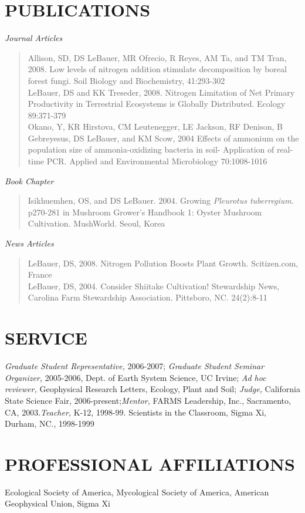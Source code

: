 \documentclass[line,10pt]{res}
\begin{document}
\begin{resume}
\section{PUBLICATIONS}
{\sl Journal Articles}
\begin{verse}
 Allison, SD, DS LeBauer, MR Ofrecio, R Reyes, AM Ta, and TM Tran, 2008. Low levels of nitrogen addition stimulate decomposition by boreal forest fungi. Soil Biology and Biochemistry, 41:293-302 \\ 
 LeBauer, DS and KK Treseder, 2008. Nitrogen Limitation of Net Primary Productivity in Terrestrial Ecosystems is Globally Distributed. Ecology 89:371-379\\
 Okano, Y, KR Hirstova, CM Leutenegger, LE Jackson, RF Denison, B Gebreyesus, DS LeBauer, and KM Scow, 2004 Effects of ammonium on the population size of ammonia-oxidizing bacteria in soil- Application of real-time PCR. Applied and Environmental Microbiology 70:1008-1016\\
\end{verse}

{\sl Book Chapter}
\begin{verse}
 Isikhuemhen, OS, and DS LeBauer. 2004. Growing \textit{Pleurotus tuberregium}. p270-281 in Mushroom Grower's Handbook 1: Oyster Mushroom Cultivation. MushWorld. Seoul, Korea\\
\end{verse}

{\sl News Articles}
\begin{verse} 
 LeBauer, DS, 2008. Nitrogen Pollution Boosts Plant Growth. Scitizen.com, France\\
 LeBauer, DS, 2004. Consider Shiitake Cultivation! Stewardship News, Carolina Farm Stewardship Association. Pittsboro, NC. 24(2):8-11 \end{verse}

\section{SERVICE} {\sl Graduate Student Representative,} 2006-2007;  {\sl Graduate Student Seminar Organizer,} 2005-2006, Dept. of Earth System Science, UC Irvine;  {\sl  Ad hoc reviewer,} Geophysical Research Letters, Ecology, Plant and Soil; {\sl Judge,} California State Science Fair, 2006-present;{\sl Mentor,} FARMS Leadership, Inc., Sacramento, CA, 2003.{\sl  Teacher,} K-12, 1998-99. Scientists in the Classroom, Sigma Xi, Durham, NC., 1998-1999

\section{PROFESSIONAL AFFILIATIONS} Ecological Society of America, Mycological Society of America, American Geophysical Union, Sigma Xi

\end{resume}
\end{document}
